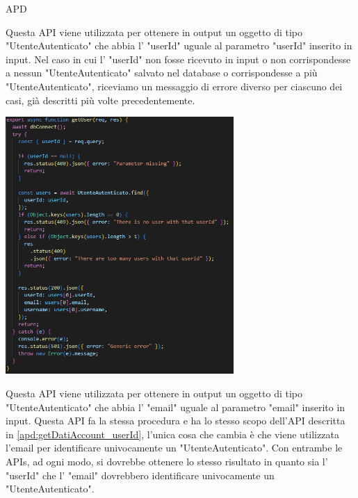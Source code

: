 \begin{listaPersonale} {APD}
\begin{listaPersonale2}[APD]{}
                \newpage
                Questa API viene utilizzata per ottenere in output un oggetto di tipo "UtenteAutenticato" che abbia l' "userId" uguale al parametro "userId" inserito in input. Nel caso in cui l' "userId" non fosse ricevuto in input o non corrispondesse a nessun "UtenteAutenticato" salvato nel database o corrispondesse a più "UtenteAutenticato", riceviamo un messaggio di errore diverso per ciascuno dei casi, già descritti più volte precedentemente.
                \begin{center}
                    \includegraphics[width=0.65\textwidth, height=0.55\textheight]{img/png/APIs/getUser_userId.png}
                \end{center}
                \newpage
                Questa API viene utilizzata per ottenere in output un oggetto di tipo "UtenteAutenticato" che abbia l' "email" uguale al parametro "email" inserito in input. Questa API fa la stessa procedura e ha lo stesso scopo dell'API descritta in \ref{apd:getDatiAccount_userId}, l'unica cosa che cambia è che viene utilizzata l'email per identificare univocamente un "UtenteAutenticato". Con entrambe le APIs, ad ogni modo, si dovrebbe ottenere lo stesso risultato in quanto sia l' "userId" che l' "email" dovrebbero identificare univocamente un "UtenteAutenticato".

\end{listaPersonale2}
\end{listaPersonale}
